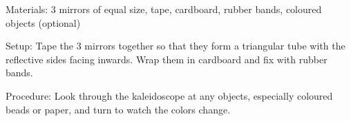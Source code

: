 \begin{multicols}{2}
\begin{description*}
\item[Materials:]{3 mirrors of equal size, tape, cardboard, rubber bands, coloured objects (optional)}
\item[Setup:]{Tape the 3 mirrors together so that they form a triangular tube with the reflective sides facing inwards. Wrap them in cardboard and fix with rubber bands.}
\item[Procedure:]{Look through the kaleidoscope at any objects, especially coloured beads or paper, and turn to watch the colors change.}
\end{description*}


\end{multicols}

\pagebreak